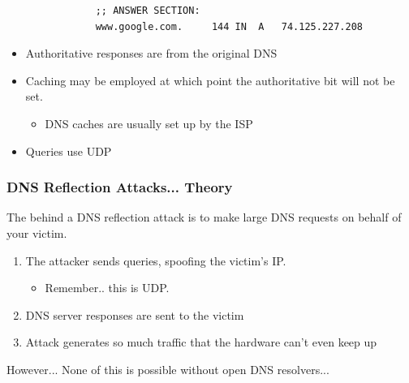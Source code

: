 \documentclass{beamer}
\begin{document}
\begin{frame}
\begin{itemize}
\begin{lstlisting}
			;; ANSWER SECTION:
			www.google.com.		144	IN	A	74.125.227.208
			\end{lstlisting}
		\item Authoritative responses are from the original DNS
		\item Caching may be employed at which point the authoritative bit will not
			be set.
			\begin{itemize}
				\item DNS caches are usually set up by the ISP
			\end{itemize}
		\item Queries use UDP %
	\end{itemize}
\end{frame}

\begin{frame}
	\frametitle{DNS Reflection Attacks... Theory}
	The behind a DNS reflection attack is to make {\Large large} DNS requests on
	behalf of your victim. 
	\begin{enumerate}
		\item The attacker sends queries, spoofing the victim's IP.  
			\begin{itemize}
				\item Remember.. this is UDP. 
			\end{itemize}
		\item DNS server responses are sent to the victim
		\item Attack generates so much traffic that the hardware can't even keep up
	\end{enumerate}
	However... None of this is possible without open DNS resolvers...
\end{frame}
\end{document}
